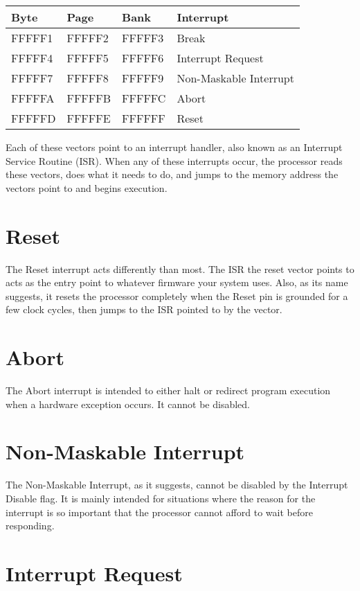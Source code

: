 \documentclass[letterpaper,12pt]{book}
\begin{document}
\begin{tabular}{|l|l|l|l|}
\hline
	Byte & Page & Bank & Interrupt\\
\hline
	FFFFF1 & FFFFF2 & FFFFF3 & Break\\
	FFFFF4 & FFFFF5 & FFFFF6 & Interrupt Request\\
	FFFFF7 & FFFFF8 & FFFFF9 & Non-Maskable Interrupt\\
	FFFFFA & FFFFFB & FFFFFC & Abort\\
	FFFFFD & FFFFFE & FFFFFF & Reset\\
\hline
\end{tabular}

Each of these vectors point to an interrupt handler, also known as an Interrupt Service Routine (ISR). When any of these interrupts occur, the processor reads these vectors, does what it needs to do, and jumps to the memory address the vectors point to and begins execution.

\section{Reset}

The Reset interrupt acts differently than most. The ISR the reset vector points to acts as the entry point to whatever firmware your system uses. Also, as its name suggests, it resets the processor completely when the Reset pin is grounded for a few clock cycles, then jumps to the ISR pointed to by the vector.

\section{Abort}

The Abort interrupt is intended to either halt or redirect program execution when a hardware exception occurs. It cannot be disabled.

\section{Non-Maskable Interrupt}

The Non-Maskable Interrupt, as it suggests, cannot be disabled by the Interrupt Disable flag. It is mainly intended for situations where the reason for the interrupt is so important that the processor cannot afford to wait before responding.

\section{Interrupt Request}
\end{document}
